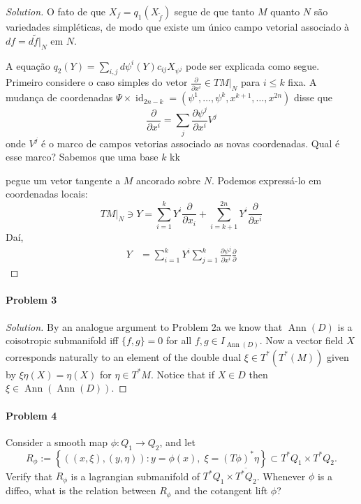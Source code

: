 \begin{proof}[Solution]
	O fato de que $X_f=q_1(X_{\tilde{f}})$ segue de que tanto $M$ quanto $N$ s\~ao variedades simpl\'eticas, de modo que existe um \'unico campo vetorial associado à  $df=d\tilde{f}|_{N}$ em $N$.

A equa\c c\~ao $q_2(Y)=\sum_{i,j}d\psi^i(Y)c_{ij}X_{\psi^j}$ pode ser explicada como segue. Primeiro considere o caso simples do vetor $\frac{\partial }{\partial x^i}\in TM|_{N}$ para $i\leq k$ fixa. A mudança de coordenadas $\Psi\times \operatorname{id}_{2n-k}=(\psi^1,\ldots,\psi^k,x^{k+1},\ldots,x^{2n})$ disse que
\[\frac{\partial }{\partial x^i}=\sum_{j}\frac{\partial \psi^j}{\partial x^i}V^j\]
onde $V^j$ \'e o marco de campos vetorias associado as novas coordenadas. Qual \'e esse marco? Sabemos que uma base $k$ kk


pegue um vetor tangente a $M$ ancorado sobre $N$. Podemos expressá-lo em coordenadas locais:
\[TM|_{N}\ni Y=\sum_{i=1}^kY^i\frac{\partial }{\partial x_i}+\sum_{i=k+1}^{2n}Y^i\frac{\partial }{\partial x^i}\]
Da\'i, \begin{align*}
	Y&=\sum_{i=1}^kY^i\sum_{j=1}^k\frac{\partial \psi^j}{\partial x^i}\frac{\partial }{\partial }
\end{align*}
\end{proof}

\paragraph{Problem 3}

\begin{proof}[Solution]\leavevmode
	By an analogue argument to Problem 2a we know that $\operatorname{Ann}(D)$ is a coisotropic submanifold iff $\{f,g\} =0$ for all $f,g\in I_{\operatorname{Ann}(D)}$. Now a vector field $X$ corresponds naturally to an element of the double dual $\xi \in T^*(T^*(M))$ given by $\xi\eta(X)=\eta(X)$ for  $\eta\in T^*M$. Notice that if $X \in D$ then $\xi \in \operatorname{Ann}(\operatorname{Ann}(D) )$.
\end{proof}

\paragraph{Problem 4} Consider a smooth map $\phi:Q_1\to Q_2$, and let
\[R_{\phi}:=\left\{ \left( (x,\xi),(y,\eta) \right) :y=\phi(x),\;\xi=(T\phi)^*\eta \right\} \subset T^*Q_1\times T^*Q_2.\]
Verify that $R_\phi$ is a lagrangian submanifold of $T^* Q_1\times \overline{T^*Q_2}$. Whenever $\phi$ is a diffeo, what is the relation between $R_\phi$ and the cotangent lift $\hat{\phi}$?

